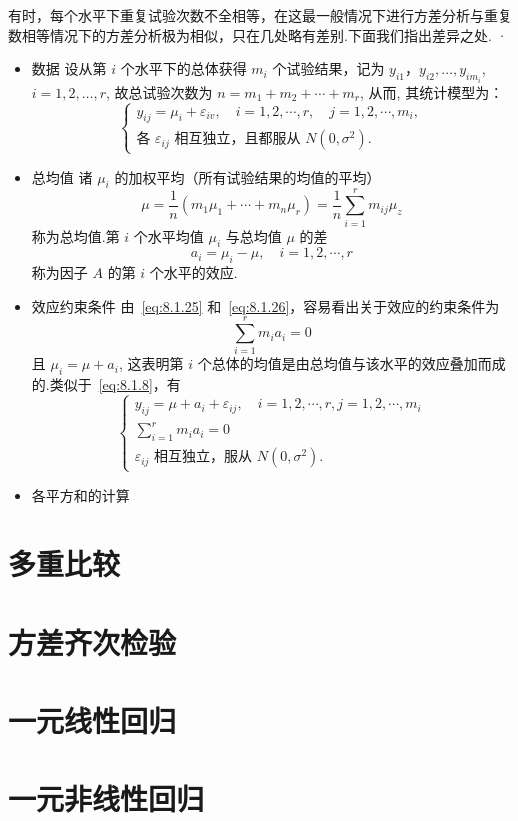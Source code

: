 有时，每个水平下重复试验次数不全相等，在这最一般情况下进行方差分析与重复数相等情况下的方差分析极为相似，只在几处略有差别.下面我们指出差异之处.
·
\begin{itemize}
  \item 数据
  设从第 $i$ 个水平下的总体获得 $m_i$ 个试验结果，记为 $y_{i1}，y_{i2},\ldots,y_{im_{i}}$, $i=1,2,\ldots,r$, 故总试验次数为 $n=m_1+m_2+\cdots+m_r$, 从而, 其统计模型为：
  \begin{equation}\label{eq:8.1.24}
    \begin{cases}
      y_{i j}=\mu_{i}+\varepsilon_{i v}, \quad i=1,2, \cdots, r, \quad j=1,2, \cdots, m_{i},\\
      \text{各 $\varepsilon_{ij}$ 相互独立，且都服从 $N(0,\sigma^2)$}.
    \end{cases}
  \end{equation}
  \item 总均值
  诸 $\mu_i$ 的加权平均（所有试验结果的均值的平均）
  \begin{equation}\label{eq:8.1.25}
    \mu=\frac{1}{n}\left(m_{1} \mu_{1}+\cdots+m_{n} \mu_{r}\right)=\frac{1}{n} \sum_{i=1}^{r} m_{i j} \mu_{z}
  \end{equation}
  称为总均值.第 $i$ 个水平均值 $\mu_i$ 与总均值 $\mu$ 的差
  \begin{equation}\label{eq:8.1.26}
    a_{i}=\mu_{i}-\mu, \quad i=1,2, \cdots, r
  \end{equation}
  称为因子 $A$ 的第 $i$ 个水平的效应.
  \item 效应约束条件
  由~\eqref{eq:8.1.25} 和~\eqref{eq:8.1.26}，容易看出关于效应的约束条件为
  \begin{equation*}
    \sum_{i=1}^{r} m_{i} a_{i}=0
  \end{equation*}
  且 $\mu_i = \mu + a_i$, 这表明第 $i$ 个总体的均值是由总均值与该水平的效应叠加而成的.类似于~\eqref{eq:8.1.8}，有
  \begin{equation}\label{eq:8.1.27}
    \begin{cases}
      y_{i j}=\mu+a_{i}+\varepsilon_{i j}, \quad i=1,2, \cdots, r, j=1,2, \cdots, m_{i}\\
      \sum_{i=1}^{r} m_{i} a_{i}=0\\
      \text{$\varepsilon_{ij}$ 相互独立，服从 $N(0,\sigma^2)$}.
    \end{cases}
  \end{equation}
  \item 各平方和的计算
\end{itemize}



\section{多重比较}\label{sec:8.2}

\section{方差齐次检验}\label{sec:8.3}

\section{一元线性回归}\label{sec:8.4}

\section{一元非线性回归}\label{sec:8.5}
